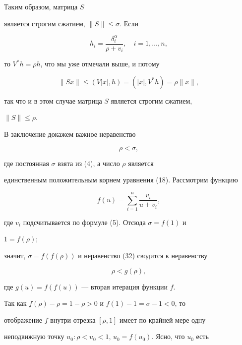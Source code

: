 Таким образом, матрица $S$ 


является строгим сжатием, $\|S\|\le\sigma$. Если 


$$ 


h_i=\frac{\delta^\alpha_i}{\rho+v_i},\quad i=1,\dotsc,n, 


$$ 


то $V^*h=\rho h$, что мы уже отмечали выше, и потому 


$$ 


\|S x\|\le(V|x|,h)=(|x|,V^*h)=\rho\|x\|,


$$ 


так что и в этом случае матрица $S$ является строгим сжатием, 


$\|S\|\le\rho$. 


 


В заключение докажем важное неравенство 


\begin{equation} 


\rho<\sigma, 


\end{equation} 


где постоянная $\sigma$ взята из (4), а число $\rho$ является 


единственным положительным корнем уравнения (18). Рассмотрим функцию 


$$ 


f(u)=\sum^n_{i=1}\frac{v_i}{u+v_i}, 


$$ 


где $v_i$ подсчитывается по формуле (5). Отсюда $\sigma=f(1)$ и 


$1=f(\rho)$; 


значит, $\sigma=f(f(\rho))$ и неравенство (32) сводится к неравенству 


\begin{equation} 


\rho<g(\rho), 


\end{equation} 


где $g(u)=f(f(u))$ --- вторая итерация функции $f$. 


 


Так как $f(\rho)-\rho=1-\rho>0$ и $f(1)-1=\sigma-1<0$, то 


отображение $f$ внутри отрезка $[\rho,1]$ имеет по крайней мере одну  


неподвижную точку $u_0:\rho<u_0<1$, $u_0=f(u_0)$. Ясно, что $u_0$ есть 


